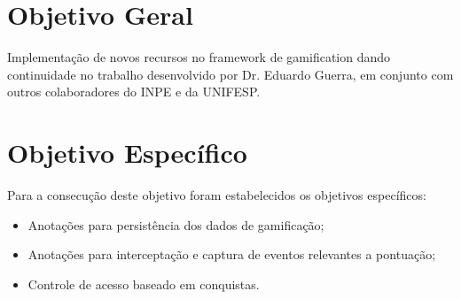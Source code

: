 \section{Objetivo Geral}
\par Implementação de novos recursos no framework de gamification dando continuidade no trabalho desenvolvido por Dr. Eduardo Guerra, em conjunto com outros colaboradores do INPE e da UNIFESP. 

\section{Objetivo Espec\'ifico}
\par Para a consecução deste objetivo foram estabelecidos os objetivos específicos:
\begin{itemize}
    \item Anotações para persistência dos dados de gamificação;
    \item Anotações para interceptação e captura de eventos relevantes a pontuação;
    \item Controle de acesso baseado em conquistas.
\end{itemize}
